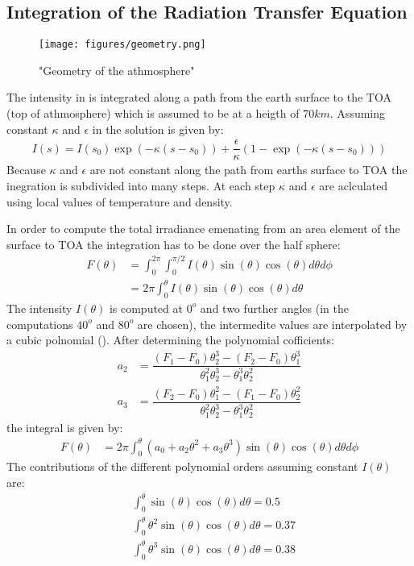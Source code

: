 \subsection{Integration of the Radiation Transfer Equation}

\begin{figure}[h]
	\texttt{[image: figures/geometry.png]}
	\caption{"Geometry of the athmosphere"}
	\label{fig:geometry}
\end{figure}

The intensity in  is integrated along a path from the earth surface to the TOA (top of athmosphere) which is assumed to be at a heigth of $70 km$. Assuming constant $\kappa$ and $\epsilon$ in  the solution is given by:
\begin{align}
	I(s) = I(s_0) \exp( -  \kappa (s-s_0)) +  \dfrac{\epsilon}{\kappa} \left(1 - \exp( - \kappa (s-s_0))\right)
\end{align}
Because $\kappa$ and $\epsilon$ are not constant along the path from earths surface to TOA the inegration is subdivided into many steps. At each step $\kappa$ and $\epsilon$ are aclculated using local values of temperature and density.

In order to compute the total irradiance emenating from an area element of the surface to TOA the integration has to be done over the half sphere:
\begin{align}
	F(\theta) &= \int_0^{2 \pi} \int_0^{\pi/2} I(\theta) \sin(\theta) \cos(\theta)  d \theta d \phi \\
	  &= 2 \pi \int_0^{\theta} I(\theta) \sin(\theta) \cos(\theta) d \theta
\end{align}
The intensity $I(\theta)$ is computed at $0^o$ and two further angles (in the computations $40^o$ and $80^o$ are chosen), 
the intermedite values are interpolated by a cubic polnomial ().
After determining the polynomial cofficients:
\begin{align}
	a_2 &= \dfrac{(F_1 - F_0) \theta_2^3 - (F_2 - F_0) \theta_1^3}{\theta_1^2 \theta_2^3 - \theta_1^3 \theta_2^2} \\
	a_3 &= \dfrac{(F_2 - F_0) \theta_1^2 - (F_1 - F_0) \theta_2^2}{\theta_1^2 \theta_2^3 - \theta_1^3 \theta_2^2}
 \end{align}  
the integral is given by:
\begin{align}
	F(\theta) &= 2 \pi \int_0^{\theta} \left(a_0 + a_2 \theta^2 + a_3 \theta^3\right) \sin(\theta) \cos(\theta)  d \theta d \phi
\end{align}
The contributions of the different polynomial orders assuming constant $I(\theta)$ are:
\begin{align*}
	 &\int_0^{\theta} \sin(\theta) \cos(\theta) d \theta = 0.5 \\
	 &\int_0^{\theta} \theta^2 \sin(\theta) \cos(\theta) d \theta = 0.37  \\
	 &\int_0^{\theta} \theta^3 \sin(\theta) \cos(\theta) d \theta = 0.38
\end{align*}

